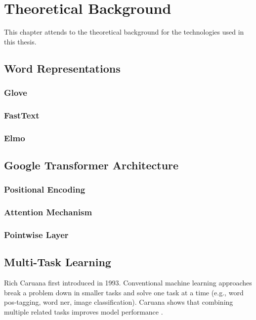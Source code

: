 \chapter{Theoretical Background}
\label{ch:theory}

This chapter attends to the theoretical background for the technologies used in this thesis.

\section{Word Representations}

\subsection{Glove}

\subsection{FastText}

\subsection{Elmo}

\section{Google Transformer Architecture}
\subsection{Positional Encoding}
\subsection{Attention Mechanism}
\subsection{Pointwise Layer}


\section{Multi-Task Learning}

Rich Caruana first introduced  in 1993. Conventional machine learning approaches break a problem down in smaller tasks and solve one task at a time (e.g., word \gls{pos}-tagging, word \gls{ner}, image classification). Caruana shows that combining multiple related tasks improves model performance \cite{Caruana1993}\cite{Caruana1997a}. 

